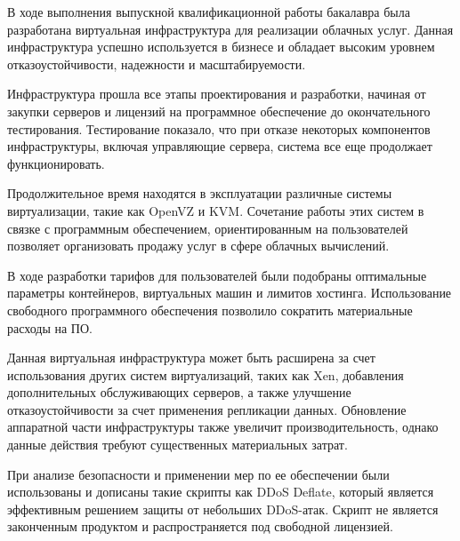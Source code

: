 
В ходе выполнения выпускной квалификационной работы бакалавра была разработана виртуальная инфраструктура для реализации облачных услуг.
Данная инфраструктура успешно используется в бизнесе и обладает высоким уровнем отказоустойчивости, надежности и масштабируемости.

Инфраструктура прошла все этапы проектирования и разработки, начиная от закупки серверов и лицензий на программное обеспечение до окончательного тестирования.
Тестирование показало, что при отказе некоторых компонентов инфраструктуры, включая управляющие сервера, система все еще продолжает функционировать.

Продолжительное время находятся в эксплуатации различные системы виртуализации, такие как OpenVZ и KVM.
Сочетание работы этих систем в связке с программным обеспечением, ориентированным на пользователей позволяет организовать продажу услуг в сфере облачных вычислений.

В ходе разработки тарифов для пользователей были подобраны оптимальные параметры контейнеров, виртуальных машин и лимитов хостинга.
Использование свободного программного обеспечения позволило сократить материальные расходы на ПО.

Данная виртуальная инфраструктура может быть расширена за счет использования других систем виртуализаций, таких как Xen, добавления дополнительных обслуживающих серверов, а также улучшение отказоустойчивости за счет применения репликации данных.
Обновление аппаратной части инфраструктуры также увеличит производительность, однако данные действия требуют существенных материальных затрат.

При анализе безопасности и применении мер по ее обеспечении были использованы и дописаны такие скрипты как DDoS Deflate, который является эффективным решением защиты от небольших DDoS-атак.
Скрипт не является законченным продуктом и распространяется под свободной лицензией.

\clearpage
